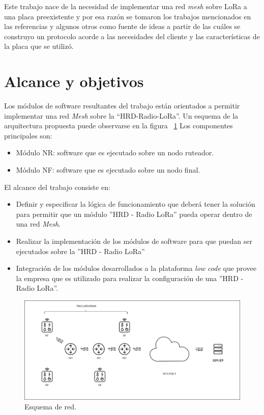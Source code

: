 Este trabajo nace de la necesidad de implementar una red \emph{mesh} sobre LoRa a una placa preexistente y por esa razón se tomaron los trabajos mencionados en las referencias y algunos otros como fuente de ideas a partir de las cuáles se construyo un protocolo acorde a las necesidades del cliente y las características de la placa que se utilizó.\citep{WEBSITE:5} 



\section{Alcance y objetivos}

Los módulos de software resultantes del trabajo están orientados a permitir implementar una red \emph{Mesh} sobre la “HRD-Radio-LoRa”. Un esquema de la arquitectura propuesta puede observarse en la figura ~\ref{fig:Esquema de red}
Los componentes principales son:

\begin{itemize}
\item Módulo NR: software que es ejecutado sobre un nodo ruteador.
\item Módulo NF: software que es ejecutado sobre un nodo final.
\end{itemize}

El alcance del trabajo consiste en:

\begin{itemize}
\item Definir y especificar la lógica de funcionamiento que deberá tener la solución para permitir que un módulo ”HRD - Radio LoRa” pueda operar dentro de una red \emph{Mesh}.
\item Realizar la implementación de los módulos de software para que puedan ser ejecutados sobre la ”HRD - Radio LoRa”
\item Integración de los módulos desarrollados a la plataforma \emph{low code} que provee la empresa que es utilizado para realizar la configuración de una ”HRD - Radio LoRa”.

\end{itemize}

\begin{figure}
\includegraphics[width=1\textwidth]{./Figures/esquema_basico_de_red.drawio.png}
\caption{Esquema de red.}
\label{fig:Esquema de red}
\end{figure}